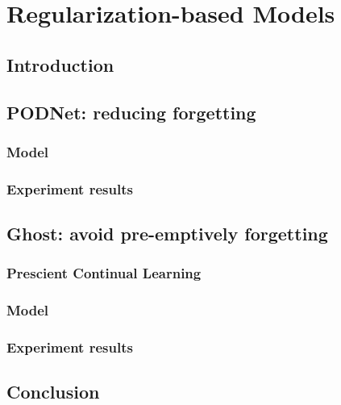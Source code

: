 \chapter{Regularization-based Models}
\label{chapter:regularization}

{}


\section{Introduction}

\section{PODNet: reducing forgetting}

\subsection{Model}

\subsection{Experiment results}


\section{Ghost: avoid pre-emptively forgetting}

\subsection{Prescient Continual Learning}

\subsection{Model}

\subsection{Experiment results}


\section{Conclusion}

